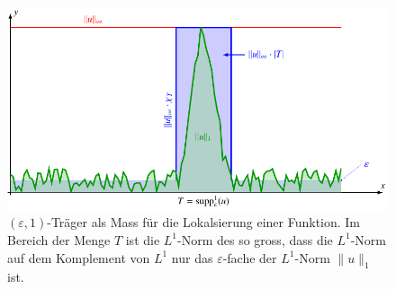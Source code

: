 %
%
%
\begin{figure}
\centering
\includegraphics{chapters/060-diskret/images/etraeger.pdf}
\caption{$(\varepsilon,1)$-Träger als Mass für die Lokalsierung
einer Funktion.
Im Bereich der Menge $T$ ist die $L^1$-Norm des so gross, dass
die $L^1$-Norm auf dem Komplement von $L^1$ nur das $\varepsilon$-fache
der $L^1$-Norm $\|u\|_1$ ist.
\label{buch:diskret:unschaerfe:fig:etraeger}}
\end{figure}%
